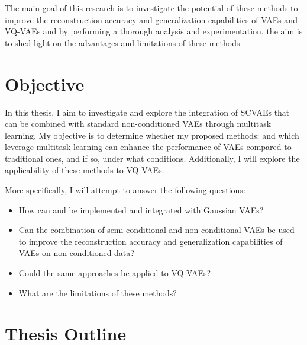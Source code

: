 The main goal of this research is to investigate the potential of these methods to improve the reconstruction accuracy and generalization capabilities of VAEs and VQ-VAEs and by performing a thorough analysis and experimentation, the aim is to shed light on the advantages and limitations of these methods.

\section{Objective}

In this thesis, I aim to investigate and explore the integration of SCVAEs that can be combined with standard non-conditioned VAEs through multitask learning. My objective is to determine whether my proposed methods: and  which leverage multitask learning can enhance the performance of VAEs compared to traditional ones, and if so, under what conditions. Additionally, I will explore the applicability of these methods to VQ-VAEs.

More specifically, I will attempt to answer the following questions:

\begin{itemize}
    \item How can  and  be implemented and integrated with Gaussian VAEs?
    \item Can the combination of semi-conditional and non-conditional VAEs be used to improve the reconstruction accuracy and generalization capabilities of VAEs on non-conditioned data?
    \item Could the same approaches be applied to VQ-VAEs?
    \item What are the limitations of these methods?

\end{itemize}



\section{Thesis Outline}



